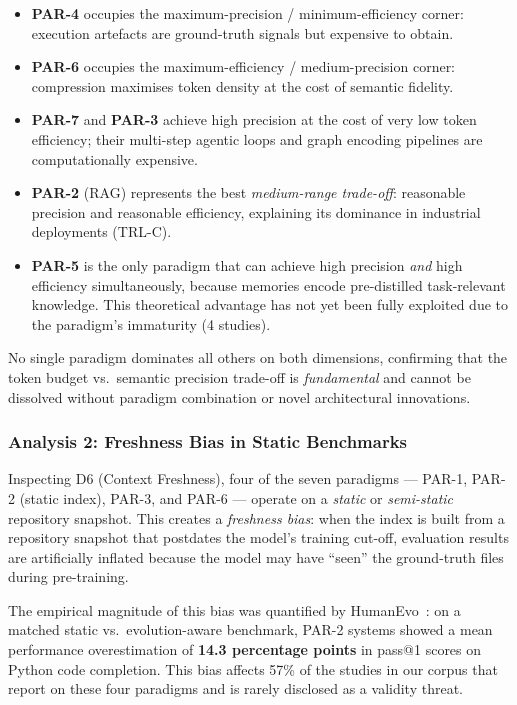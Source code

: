 \documentclass[acmsmall,screen,review]{acmart}
\begin{document}
\begin{itemize}
  \item \textbf{PAR-4} occupies the maximum-precision / minimum-efficiency
    corner: execution artefacts are ground-truth signals but expensive
    to obtain.
  \item \textbf{PAR-6} occupies the maximum-efficiency /
    medium-precision corner: compression maximises token density at the
    cost of semantic fidelity.
  \item \textbf{PAR-7} and \textbf{PAR-3} achieve high precision at
    the cost of very low token efficiency; their multi-step agentic
    loops and graph encoding pipelines are computationally expensive.
  \item \textbf{PAR-2} (RAG) represents the best
    \emph{medium-range trade-off}: reasonable precision and reasonable
    efficiency, explaining its dominance in industrial deployments
    (TRL-C).
  \item \textbf{PAR-5} is the only paradigm that can achieve high
    precision \emph{and} high efficiency simultaneously, because
    memories encode pre-distilled task-relevant knowledge. This
    theoretical advantage has not yet been fully exploited due to the
    paradigm's immaturity (4 studies).
\end{itemize}

No single paradigm dominates all others on both dimensions, confirming
that the token budget vs.\ semantic precision trade-off is
\emph{fundamental} and cannot be dissolved without paradigm combination
or novel architectural innovations.

\subsubsection{Analysis 2: Freshness Bias in Static Benchmarks}
\label{subsubsec:tradeoff2}

Inspecting D6 (Context Freshness), four of the seven paradigms —
PAR-1, PAR-2 (static index), PAR-3, and PAR-6 — operate on a
\emph{static} or \emph{semi-static} repository snapshot. This creates
a \emph{freshness bias}: when the index is built from a repository
snapshot that postdates the model's training cut-off, evaluation results
are artificially inflated because the model may have ``seen'' the
ground-truth files during pre-training.

The empirical magnitude of this bias was quantified by
HumanEvo~\cite{Zheng2025HumanEvo}: on a matched static vs.\
evolution-aware benchmark, PAR-2 systems showed a mean performance
overestimation of \textbf{14.3 percentage points} in pass@1 scores on
Python code completion. This bias affects 57\% of the studies in our
corpus that report on these four paradigms and is rarely disclosed as
a validity threat.
\end{document}
